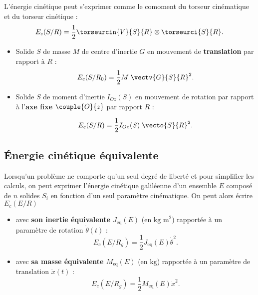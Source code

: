 
\begin{defi}
L'énergie cinétique peut s'exprimer comme le comoment du torseur cinématique et du torseur cinétique :
$$E_c(S/R)=\frac{1}{2}\torseurcin{V}{S}{R}\otimes \torseurci{S}{R}.
$$
\end{defi}


\begin{prop}[title = Cas particuliers]

\begin{itemize}
\item Solide $S$ de masse $M$ de centre d'inertie $G$ en mouvement de \textbf{translation} par rapport à $R$ :
$$
E_c(S/R_0)=\frac{1}{2}M \; \vectv{G}{S}{R}^2.
$$

\item Solide $S$ de moment d'inertie $I_{Oz}(S)$ en mouvement de rotation par rapport à l'\textbf{axe fixe} $\couple{O}{{z}}$ par rapport $R$ :

$$
E_c(S/R)=\frac{1}{2}I_{Oz}(S)\; \vecto{S}{R}^2.
$$

\end{itemize}
\end{prop}



\subsection{Énergie cinétique équivalente}

\begin{defi}

Lorsqu'un problème ne comporte qu'un seul degré de liberté et pour simplifier les calculs, on peut exprimer l'énergie cinétique galiléenne d'un ensemble $E$ composé de $n$ solides $S_i$ en fonction d'un seul paramètre cinématique.
On peut alors écrire $E_c(E/R)$ 
\begin{itemize}
\item avec \textbf{son inertie équivalente $J_{\text{eq}}(E)$} (en $\text{kg m}^2$) rapportée à un paramètre de rotation $\dot{\theta}(t)$ : 
$$
E_c(E/R_g)=\frac{1}{2}J_{\text{eq}}(E) \dot{\theta}^2.
$$
\item avec \textbf{sa masse équivalente $M_{\text{eq}}(E)$} (en $\text{kg}$) rapportée à un paramètre de translation $\dot{x}(t)$ : 
$$
E_c(E/R_g)=\frac{1}{2}M_{\text{eq}}(E) \dot{x}^2.
$$
\end{itemize}
\end{defi}

